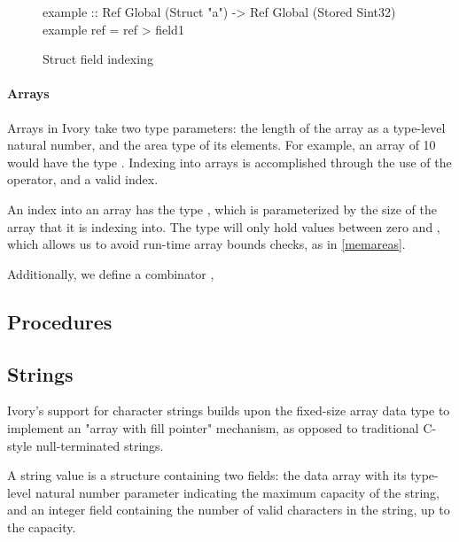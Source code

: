 \begin{figure}[h]
\begin{code}
example :: Ref Global (Struct "a")
        -> Ref Global (Stored Sint32)
example ref = ref \mytilde> field1
\end{code}
\caption{Struct field indexing}
\label{example-struct-label}
\end{figure}

\paragraph{Arrays}
Arrays in Ivory take two type parameters: the length of the array as a
type-level natural number, and the area type of its elements.  For example, an
array of 10  would have the type .  Indexing into arrays is accomplished through the use of the \cd{(!)}
operator, and a valid index.

An index into an array has the type , which is parameterized by the size
of the array that it is indexing into.  The  type will only hold
values between zero and , which allows us to avoid run-time array bounds
checks, as in \ref{memareas}.

Additionally, we define a combinator , 


\subsection{Procedures}

\subsection{Strings}
Ivory's support for character strings builds upon the fixed-size array
data type to implement an "array with fill pointer" mechanism, as opposed
to traditional C-style null-terminated strings.

A string value is a structure containing two fields: the data array
with its type-level natural number parameter indicating the maximum
capacity of the string, and an integer field containing the number of
valid characters in the string, up to the capacity.

